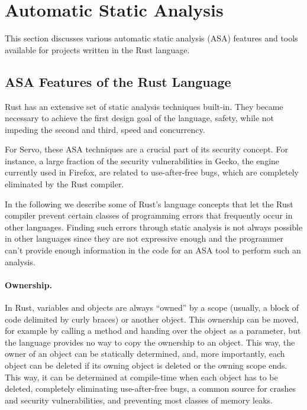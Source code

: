 \documentclass{scrartcl}
\begin{document}
\newpage


\section{Automatic Static Analysis}

This section discusses various automatic static analysis (ASA) features and tools available for projects written in the Rust language.

\subsection{ASA Features of the Rust Language} \label{rust_features}

Rust has an extensive set of static analysis techniques built-in. They became necessary to achieve the first design goal of the language, safety, while not impeding the second and third, speed and concurrency.

For Servo, these ASA techniques are a crucial part of its security concept. For instance, a large fraction of the security vulnerabilities in Gecko, the engine currently used in Firefox, are related to use-after-free bugs, which are completely eliminated by the Rust compiler.

In the following we describe some of Rust's language concepts that let the Rust compiler prevent certain classes of programming errors that frequently occur in other languages. Finding such errors through static analysis is not always possible in other languages since they are not expressive enough and the programmer can't provide enough information in the code for an ASA tool to perform such an analysis.

\paragraph{Ownership.} In Rust, variables and objects are always ``owned'' by a scope (usually, a block of code delimited by curly braces) or another object. This ownership can be moved, for example by calling a method and handing over the object as a parameter, but the language provides no way to copy the ownership to an object. This way, the owner of an object can be statically determined, and, more importantly, each object can be deleted if its owning object is deleted or the owning scope ends. This way, it can be determined at compile-time when each object has to be deleted, completely eliminating use-after-free bugs, a common source for crashes and security vulnerabilities, and preventing most classes of memory leaks.
\end{document}
